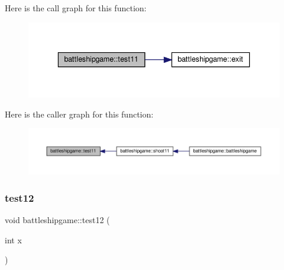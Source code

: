 Here is the call graph for this function\+:
\nopagebreak
\begin{figure}[H]
\begin{center}
\leavevmode
\includegraphics[width=336pt]{classbattleshipgame_ac984d3cc5f2c495315f0e40b3386a170_cgraph}
\end{center}
\end{figure}
Here is the caller graph for this function\+:
\nopagebreak
\begin{figure}[H]
\begin{center}
\leavevmode
\includegraphics[width=350pt]{classbattleshipgame_ac984d3cc5f2c495315f0e40b3386a170_icgraph}
\end{center}
\end{figure}
\mbox{\label{classbattleshipgame_a801729b71aadc28bf27a2cdf9863a0f2}} 
\subsubsection{\texorpdfstring{test12}{test12}}
{\footnotesize\ttfamily void battleshipgame\+::test12 (\begin{DoxyParamCaption}\item[{int}]{x }\end{DoxyParamCaption})\hspace{0.3cm}{\ttfamily [slot]}}


